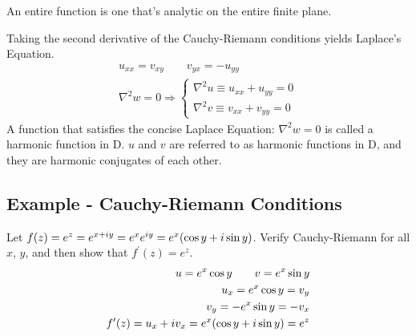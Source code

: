     An entire function is one that's analytic on the entire finite plane.

    Taking the second derivative of the Cauchy-Riemann conditions yields
    Laplace's Equation.
    \begin{align*}
        u_{xx} = v_{xy} \qquad v_{yx} = -u_{yy}\\
        \nabla^2 w = 0 \Rightarrow \begin{cases}
            \nabla^2 u \equiv u_{xx} + u_{yy} = 0\\
            \nabla^2 v \equiv v_{xx} + v_{yy} = 0
        \end{cases}
    \end{align*}
    A function that satisfies the concise Laplace Equation: $\nabla^2 w = 0$
    is called a harmonic function in D. $u$ and $v$ are referred to as
    harmonic functions in D, and they are harmonic conjugates of each other.

    \subsection{Example - Cauchy-Riemann Conditions}
    Let $f(z) = e^z = e^{x+i y} = e^x e^{iy} = e^x {\left( \cos y + i \sin
    y \right)}$. Verify Cauchy-Riemann for all $x$, $y$, and then show that
    $f^\prime(z) = e^z$.
    \begin{align*}
        u = e^x \cos y \qquad v = e^x \sin y\\
        u_x = e^x \cos y = v_y\\
        v_y = -e^x \sin y = -v_x\\
        f^\prime(z) = u_x + i v_x = e^x {\left( \cos y + i \sin y \right)} = e^z
    \end{align*}

